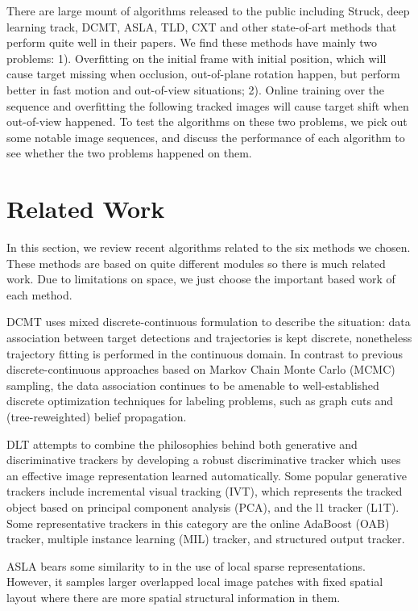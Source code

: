 \documentclass{acm_proc_article-sp}
\begin{document}
There are large mount of algorithms released to the public including Struck\cite{struck}, deep learning track\cite{dlt}, DCMT\cite{dcmt}, ASLA\cite{asla}, TLD\cite{tld}, CXT\cite{cxt} and other state-of-art methods that perform quite well in their papers. 
We find these methods have mainly two problems: 
1). Overfitting on the initial frame with initial position, which will cause target missing when occlusion, out-of-plane rotation happen, but perform better in fast motion and out-of-view situations;
2). Online training over the sequence and overfitting the following tracked images will cause target shift when out-of-view happened.
To test the algorithms on these two problems, we pick out some notable image sequences, and discuss the performance of each algorithm to see whether the two problems happened on them.

\section{Related Work}
In this section, we review recent algorithms related to the six methods we chosen.
These methods are based on quite different modules so there is much related work.
Due to limitations on space, we just choose the important based work of each method.

DCMT uses mixed discrete-continuous formulation to describe the situation: data association between target detections and trajectories is kept discrete, nonetheless trajectory ﬁtting is performed in the continuous domain.
In contrast to previous discrete-continuous approaches based on Markov Chain Monte Carlo (MCMC) sampling\cite{rw4}\cite{rw5}, the data association continues to be amenable to well-established discrete optimization techniques for labeling problems, such as graph cuts\cite{rw2}\cite{rw3} and (tree-reweighted) belief propagation\cite{rw1}.

DLT attempts to combine the philosophies behind both generative and discriminative trackers by developing a robust discriminative tracker which uses an effective image representation learned automatically.
Some popular generative trackers include incremental visual tracking (IVT), which represents the tracked object based on principal component analysis (PCA), and the l1 tracker (L1T).
Some representative trackers in this category are the online AdaBoost (OAB) tracker, multiple instance learning (MIL) tracker, and structured output tracker.

ASLA bears some similarity to\cite{rw6} in the use of local sparse representations.
However, it samples larger overlapped local image patches with fixed spatial layout where there are more spatial structural information in them.
\end{document}
